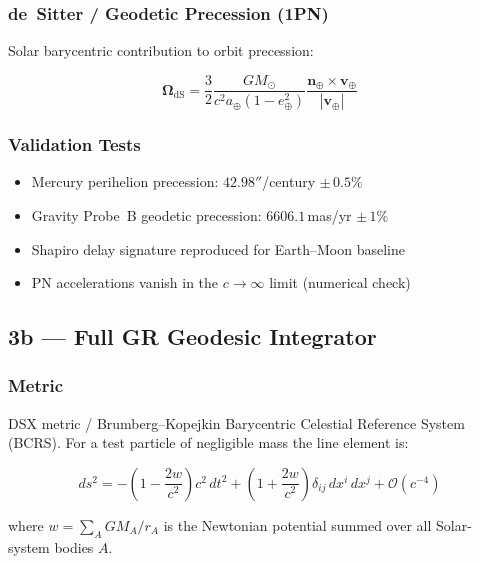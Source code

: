 \documentclass[11pt, a4paper]{article}
\begin{document}
\subsubsection{de~Sitter / Geodetic Precession (1PN)}

Solar barycentric contribution to orbit precession:

\begin{equation}
  \boldsymbol{\Omega}_\text{dS} =
    \frac{3}{2}\frac{GM_\odot}{c^2 a_\oplus(1-e_\oplus^2)}
    \frac{\boldsymbol{n}_\oplus \times \mathbf{v}_\oplus}{|\mathbf{v}_\oplus|}
\end{equation}

\subsubsection{Validation Tests}

\begin{itemize}[noitemsep]
  \item Mercury perihelion precession: $42.98''$/century $\pm\,0.5\%$
  \item Gravity Probe~B geodetic precession: $6606.1\,$mas/yr $\pm\,1\%$
  \item Shapiro delay signature reproduced for Earth--Moon baseline
  \item PN accelerations vanish in the $c\to\infty$ limit (numerical check)
\end{itemize}

\subsection{3b — Full GR Geodesic Integrator}

\subsubsection{Metric}

DSX metric / Brumberg--Kopejkin Barycentric Celestial Reference System (BCRS).
For a test particle of negligible mass the line element is:

\begin{equation}
  ds^2 = -\left(1 - \frac{2w}{c^2}\right)c^2\,dt^2
         + \left(1 + \frac{2w}{c^2}\right)\delta_{ij}\,dx^i\,dx^j
         + \mathcal{O}(c^{-4})
\end{equation}

where $w = \sum_A G M_A / r_A$ is the Newtonian potential summed over all
Solar-system bodies $A$.
\end{document}

